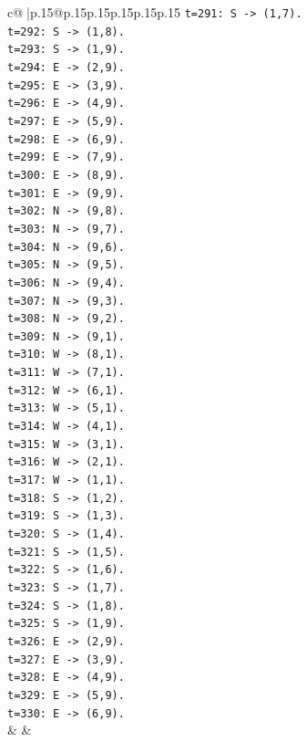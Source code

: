 \documentclass{article}
\begin{document}
{\begin{supertabular}{c@{$\;$}|p{.15\linewidth}@{}p{.15\linewidth}p{.15\linewidth}p{.15\linewidth}p{.15\linewidth}p{.15\linewidth}}
{{{\texttt{t=291: S {-}> (1,7).} \\
\texttt{t=292: S {-}> (1,8).} \\
\texttt{t=293: S {-}> (1,9).} \\
\texttt{t=294: E {-}> (2,9).} \\
\texttt{t=295: E {-}> (3,9).} \\
\texttt{t=296: E {-}> (4,9).} \\
\texttt{t=297: E {-}> (5,9).} \\
\texttt{t=298: E {-}> (6,9).} \\
\texttt{t=299: E {-}> (7,9).} \\
\texttt{t=300: E {-}> (8,9).} \\
\texttt{t=301: E {-}> (9,9).} \\
\texttt{t=302: N {-}> (9,8).} \\
\texttt{t=303: N {-}> (9,7).} \\
\texttt{t=304: N {-}> (9,6).} \\
\texttt{t=305: N {-}> (9,5).} \\
\texttt{t=306: N {-}> (9,4).} \\
\texttt{t=307: N {-}> (9,3).} \\
\texttt{t=308: N {-}> (9,2).} \\
\texttt{t=309: N {-}> (9,1).} \\
\texttt{t=310: W {-}> (8,1).} \\
\texttt{t=311: W {-}> (7,1).} \\
\texttt{t=312: W {-}> (6,1).} \\
\texttt{t=313: W {-}> (5,1).} \\
\texttt{t=314: W {-}> (4,1).} \\
\texttt{t=315: W {-}> (3,1).} \\
\texttt{t=316: W {-}> (2,1).} \\
\texttt{t=317: W {-}> (1,1).} \\
\texttt{t=318: S {-}> (1,2).} \\
\texttt{t=319: S {-}> (1,3).} \\
\texttt{t=320: S {-}> (1,4).} \\
\texttt{t=321: S {-}> (1,5).} \\
\texttt{t=322: S {-}> (1,6).} \\
\texttt{t=323: S {-}> (1,7).} \\
\texttt{t=324: S {-}> (1,8).} \\
\texttt{t=325: S {-}> (1,9).} \\
\texttt{t=326: E {-}> (2,9).} \\
\texttt{t=327: E {-}> (3,9).} \\
\texttt{t=328: E {-}> (4,9).} \\
\texttt{t=329: E {-}> (5,9).} \\
\texttt{t=330: E {-}> (6,9).} \\
            }
        }
    }
    & & \\ \\


\end{supertabular}}
\end{document}
